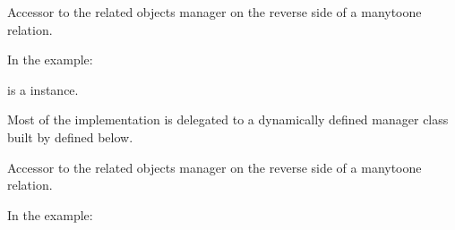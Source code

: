 \documentclass[a4paper,11pt,spanish]{sphinxmanual}
\begin{document}
\begin{fulllineitems}
\begin{fulllineitems}
\end{fulllineitems}


\begin{fulllineitems}
\label{\detokenize{api/inventory/inventory.models:inventory.models.ProductLot.inventorymovement_set}}
\pysigstartsignatures
\pysigline
{}
\pysigstopsignatures
\sphinxAtStartPar
Accessor to the related objects manager on the reverse side of a
many\sphinxhyphen{}to\sphinxhyphen{}one relation.

\sphinxAtStartPar
In the example:

\begin{sphinxVerbatim}[commandchars=\\\{\}]
       
\end{sphinxVerbatim}

\sphinxAtStartPar
{} is a  instance.

\sphinxAtStartPar
Most of the implementation is delegated to a dynamically defined manager
class built by  defined below.

\end{fulllineitems}


\begin{fulllineitems}
\label{\detokenize{api/inventory/inventory.models:inventory.models.ProductLot.inventoryperiodsnapshotitem_set}}
\pysigstartsignatures
\pysigline
{}
\pysigstopsignatures
\sphinxAtStartPar
Accessor to the related objects manager on the reverse side of a
many\sphinxhyphen{}to\sphinxhyphen{}one relation.

\sphinxAtStartPar
In the example:


\end{fulllineitems}
\end{fulllineitems}
\end{document}
